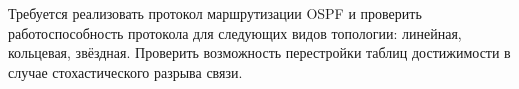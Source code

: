 Требуется реализовать протокол маршрутизации OSPF и проверить работоспособность протокола для следующих видов топологии: линейная, кольцевая, звёздная. Проверить возможность перестройки таблиц достижимости в случае стохастического разрыва связи.